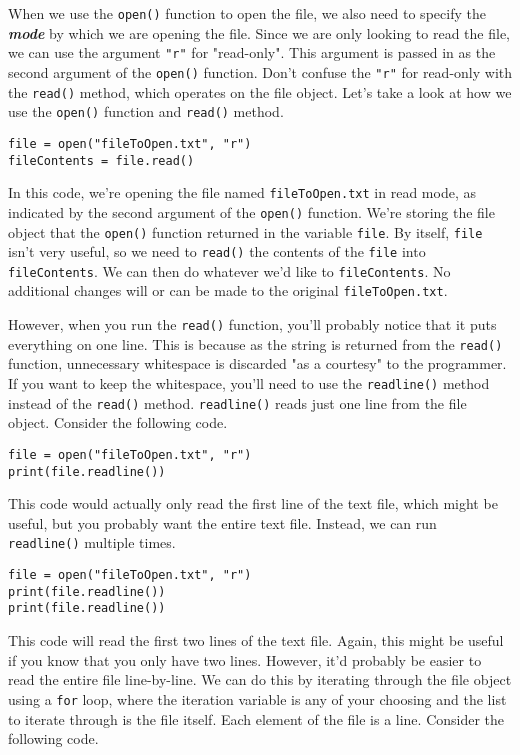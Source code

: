 When we use the \verb|open()| function to open the file, we also need to specify the \textbf{\textit{mode}} by which we are opening the file. Since we are only looking to read the file, we can use the argument \verb|"r"| for "read-only". This argument is passed in as the second argument of the \verb|open()| function. Don't confuse the \verb|"r"| for read-only with the \verb|read()| method, which operates on the file object. Let's take a look at how we use the \verb|open()| function and \verb|read()| method.\par
\begin{lstlisting}[style=pippython]
file = open("fileToOpen.txt", "r")
fileContents = file.read()
\end{lstlisting}
In this code, we're opening the file named \verb|fileToOpen.txt| in read mode, as indicated by the second argument of the \verb|open()| function. We're storing the file object that the \verb|open()| function returned in the variable \verb|file|. By itself, \verb|file| isn't very useful, so we need to \verb|read()| the contents of the \verb|file| into \verb|fileContents|. We can then do whatever we'd like to \verb|fileContents|. No additional changes will or can be made to the original \verb|fileToOpen.txt|.\par
However, when you run the \verb|read()| function, you'll probably notice that it puts everything on one line. This is because as the string is returned from the \verb|read()| function, unnecessary whitespace is discarded "as a courtesy" to the programmer. If you want to keep the whitespace, you'll need to use the \verb|readline()| method instead of the \verb|read()| method. \verb|readline()| reads just one line from the file object. Consider the following code.\par
\begin{lstlisting}[style=pippython]
file = open("fileToOpen.txt", "r")
print(file.readline())
\end{lstlisting}
This code would actually only read the first line of the text file, which might be useful, but you probably want the entire text file. Instead, we can run \verb|readline()| multiple times.\par
\begin{lstlisting}[style=pippython]
file = open("fileToOpen.txt", "r")
print(file.readline())
print(file.readline())
\end{lstlisting}
This code will read the first two lines of the text file. Again, this might be useful if you know that you only have two lines. However, it'd probably be easier to read the entire file line-by-line. We can do this by iterating through the file object using a \verb|for| loop, where the iteration variable is any of your choosing and the list to iterate through is the file itself. Each element of the file is a line. Consider the following code.\par
